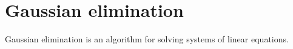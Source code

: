 \section{Gaussian elimination}
Gaussian elimination is an algorithm for solving systems of linear equations.
